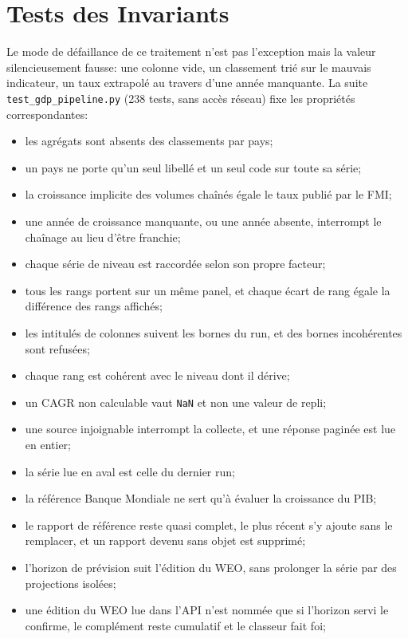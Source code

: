 \documentclass[11pt,a4paper]{article}
\begin{document}
\section{Tests des Invariants}

Le mode de défaillance de ce traitement n'est pas l'exception mais la valeur silencieusement fausse: une colonne vide, un classement trié sur le mauvais indicateur, un taux extrapolé au travers d'une année manquante. La suite \texttt{test\_gdp\_pipeline.py} (238 tests, sans accès réseau) fixe les propriétés correspondantes:

\begin{itemize}
    \item les agrégats sont absents des classements par pays;
    \item un pays ne porte qu'un seul libellé et un seul code sur toute sa série;
    \item la croissance implicite des volumes chaînés égale le taux publié par le FMI;
    \item une année de croissance manquante, ou une année absente, interrompt le chaînage au lieu d'être franchie;
    \item chaque série de niveau est raccordée selon son propre facteur;
    \item tous les rangs portent sur un même panel, et chaque écart de rang égale la différence des rangs affichés;
    \item les intitulés de colonnes suivent les bornes du run, et des bornes incohérentes sont refusées;
    \item chaque rang est cohérent avec le niveau dont il dérive;
    \item un CAGR non calculable vaut \texttt{NaN} et non une valeur de repli;
    \item une source injoignable interrompt la collecte, et une réponse paginée est lue en entier;
    \item la série lue en aval est celle du dernier run;
    \item la référence Banque Mondiale ne sert qu'à évaluer la croissance du PIB;
    \item le rapport de référence reste quasi complet, le plus récent s'y ajoute sans le remplacer, et un rapport devenu sans objet est supprimé;
    \item l'horizon de prévision suit l'édition du WEO, sans prolonger la série par des projections isolées;
    \item une édition du WEO lue dans l'API n'est nommée que si l'horizon servi le confirme, le complément reste cumulatif et le classeur fait foi;

\end{itemize}
\end{document}
